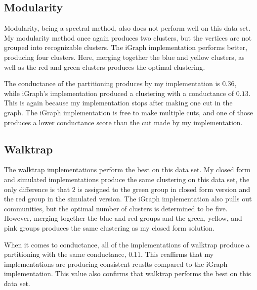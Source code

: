 \documentclass{article}
\begin{document}
    \subsection{Modularity}
    Modularity, being a spectral method, also does not perform well on this data set. My modularity method once again produces two clusters, but the vertices are not grouped into recognizable clusters. The iGraph implementation performs better, producing four clusters. Here, merging together the blue and yellow clusters, as well as the red and green clusters produces the optimal clustering.
    \par
    The conductance of the partitioning produces by my implementation is $0.36$, while iGraph's implementation produced a clustering with a conductance of $0.13$. This is again because my implementation stops after making one cut in the graph. The iGraph implementation is free to make multiple cuts, and one of those produces a lower conductance score than the cut made by my implementation.

    \subsection{Walktrap}
    The walktrap implementations perform the best on this data set. My closed form and simulated implementations produce the same clustering on this data set, the only difference is that 2 is assigned to the green group in closed form version and the red group in the simulated version. The iGraph implementation also pulls out communities, but the optimal number of clusters is determined to be five. However, merging together the blue and red groups and the green, yellow, and pink groups produces the same clustering as my closed form solution.
    \par
    When it comes to conductance, all of the implementations of walktrap produce a partitioning with the same conductance, $0.11$. This reaffirms that my implementations are producing consistent reuslts compared to the iGraph implementation. This value also confirms that walktrap performs the best on this data set.
\end{document}
